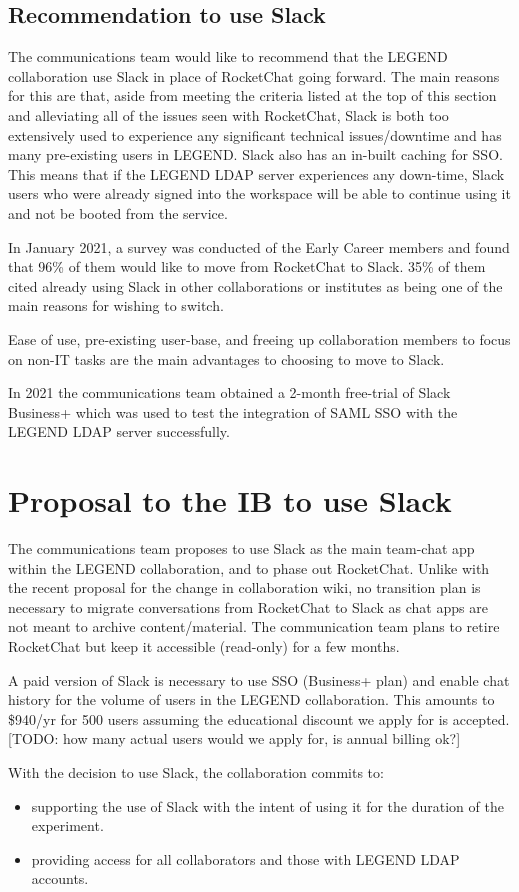 \documentclass[11pt,letterpaper]{article}
\begin{document}
\subsection{Recommendation to use Slack}
The communications team would like to recommend that the LEGEND collaboration use Slack in place of RocketChat going forward. The main reasons for this are that, aside from meeting the criteria listed at the top of this section and alleviating all of the issues seen with RocketChat, Slack is both too extensively used to experience any significant technical issues/downtime and has many pre-existing users in LEGEND. Slack also has an in-built caching for SSO. This means that if the LEGEND LDAP server experiences any down-time, Slack users who were already signed into the workspace will be able to continue using it and not be booted from the service.\par
In January 2021, a survey was conducted of the Early Career members and found that 96\% of them would like to move from RocketChat to Slack. 35\% of them cited already using Slack in other collaborations or institutes as being one of the main reasons for wishing to switch. \par
Ease of use, pre-existing user-base, and freeing up collaboration members to focus on non-IT tasks are the main advantages to choosing to move to Slack.

In 2021 the communications team obtained a 2-month free-trial of Slack Business+ which was used to test the integration of SAML SSO with the LEGEND LDAP server successfully. 

\section{Proposal to the IB to use Slack}
The communications team proposes to use Slack as the main team-chat app within the LEGEND collaboration, and to phase out RocketChat. 
Unlike with the recent proposal for the change in collaboration wiki, no transition plan is necessary to migrate conversations from RocketChat to Slack as chat apps are not meant to archive content/material. The communication team plans to retire RocketChat but keep it accessible (read-only) for a few months.

A paid version of Slack is necessary to use SSO (Business+ plan) and enable chat history for the volume of users in the LEGEND collaboration. This amounts to \$940/yr for 500 users assuming the educational discount we apply for is accepted. [TODO: how many actual users would we apply for, is annual billing ok?]

With the decision to use Slack, the collaboration commits to:
\begin{itemize}
    \item supporting the use of Slack with the intent of using it for the duration of the experiment.
    \item providing access for all collaborators and those with LEGEND LDAP accounts.
\end{itemize}
\end{document}
